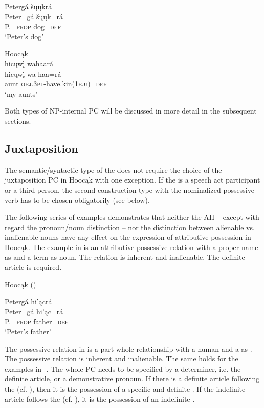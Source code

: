 \documentclass[output=paper]{LSP/langsci}
\begin{document}
\ea
\glll Petergá šųųkrá\\
Peter=gá     šųųk=rá \\
P.=\textsc{prop}    dog=\textsc{def} \\
\glt `Peter's dog'

\ex	 \label{myaunts} 
Hoocąk {}{\citealt[19]{Helmbrecht2003}} \\  
\glll hicųwį́ wahaará\\
hicųwį́  wa-haa=rá \\
aunt     \textsc{obj.3pl}-have.kin(\textsc{1e.u})=\textsc{def} \\
\glt `my aunts'
\z
\z

Both types of NP-internal PC will be discussed in more detail in the subsequent sections.

\subsection{Juxtaposition}\label{sec:helmbrecht:3.1}

The semantic/syntactic type of the  does not require the choice of the juxtaposition PC in Hoocąk with one exception. If the  is a speech act participant or a third person, the second construction type with the nominalized possessive verb has to be chosen obligatorily (see  below).
 
The following series of examples demonstrates that neither the AH – except with regard the pronoun/noun distinction – nor the distinction between alienable vs. inalienable nouns have any effect on the expression of attributive possession in Hoocąk. The example in  is an attributive possessive relation with a proper name as  and a  term as  noun. The relation is inherent and inalienable. The definite article is required.
 

\ea {}Hoocąk (\citealt[16]{Helmbrecht2003}) \label{petersfather}

\glll Petergá hi'\k{a}crá\\
Peter=gá       hi'\k{a}c=rá \\
  P.=\textsc{prop} father=\textsc{def} \\
\glt`Peter's father'
\z

The possessive relation in  is a part-whole relationship with a human  and a  as . The possessive relation is inherent and inalienable. The same holds for the examples in -. The whole PC needs to be specified by a determiner, i.e. the definite article, or a demonstrative pronoun. If there is a definite article following the  (cf. ), then it is the possession of a specific and definite . If the indefinite article follows the  (cf. ), it is the possession of an indefinite . 
\end{document}
